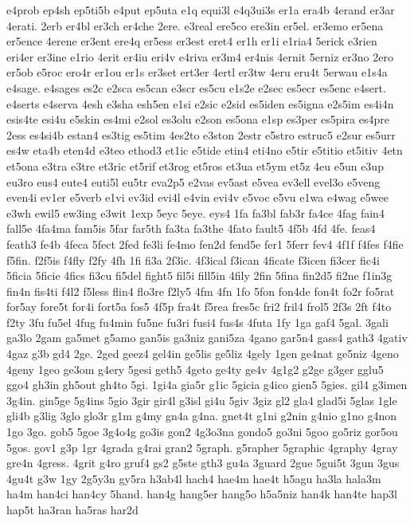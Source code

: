 {e4prob
ep4sh
ep5ti5b
e4put
ep5uta
e1q
equi3l
e4q3ui3s
er1a
era4b
4erand
er3ar
4erati.
2erb
er4bl
er3ch
er4che
2ere.
e3real
ere5co
ere3in
er5el.
er3emo
er5ena
er5ence
4erene
er3ent
ere4q
er5ess
er3est
eret4
er1h
er1i
e1ria4
5erick
e3rien
eri4er
er3ine
e1rio
4erit
er4iu
eri4v
e4riva
er3m4
er4nis
4ernit
5erniz
er3no
2ero
er5ob
e5roc
ero4r
er1ou
er1s
er3set
ert3er
4ertl
er3tw
4eru
eru4t
5erwau
e1s4a
e4sage.
e4sages
es2c
e2sca
es5can
e3scr
es5cu
e1s2e
e2sec
es5ecr
es5enc
e4sert.
e4serts
e4serva
4esh
e3sha
esh5en
e1si
e2sic
e2sid
es5iden
es5igna
e2s5im
es4i4n
esis4te
esi4u
e5skin
es4mi
e2sol
es3olu
e2son
es5ona
e1sp
es3per
es5pira
es4pre
2ess
es4si4b
estan4
es3tig
es5tim
4es2to
e3ston
2estr
e5stro
estruc5
e2sur
es5urr
es4w
eta4b
eten4d
e3teo
ethod3
et1ic
e5tide
etin4
eti4no
e5tir
e5titio
et5itiv
4etn
et5ona
e3tra
e3tre
et3ric
et5rif
et3rog
et5ros
et3ua
et5ym
et5z
4eu
e5un
e3up
eu3ro
eus4
eute4
euti5l
eu5tr
eva2p5
e2vas
ev5ast
e5vea
ev3ell
evel3o
e5veng
even4i
ev1er
e5verb
e1vi
ev3id
evi4l
e4vin
evi4v
e5voc
e5vu
e1wa
e4wag
e5wee
e3wh
ewil5
ew3ing
e3wit
1exp
5eyc
5eye.
eys4
1fa
fa3bl
fab3r
fa4ce
4fag
fain4
fall5e
4fa4ma
fam5is
5far
far5th
fa3ta
fa3the
4fato
fault5
4f5b
4fd
4fe.
feas4
feath3
fe4b
4feca
5fect
2fed
fe3li
fe4mo
fen2d
fend5e
fer1
5ferr
fev4
4f1f
f4fes
f4fie
f5fin.
f2f5is
f4fly
f2fy
4fh
1fi
fi3a
2f3ic.
4f3ical
f3ican
4ficate
f3icen
fi3cer
fic4i
5ficia
5ficie
4fics
fi3cu
fi5del
fight5
fil5i
fill5in
4fily
2fin
5fina
fin2d5
fi2ne
f1in3g
fin4n
fis4ti
f4l2
f5less
flin4
flo3re
f2ly5
4fm
4fn
1fo
5fon
fon4de
fon4t
fo2r
fo5rat
for5ay
fore5t
for4i
fort5a
fos5
4f5p
fra4t
f5rea
fres5c
fri2
fril4
frol5
2f3s
2ft
f4to
f2ty
3fu
fu5el
4fug
fu4min
fu5ne
fu3ri
fusi4
fus4s
4futa
1fy
1ga
gaf4
5gal.
3gali
ga3lo
2gam
ga5met
g5amo
gan5is
ga3niz
gani5za
4gano
gar5n4
gass4
gath3
4gativ
4gaz
g3b
gd4
2ge.
2ged
geez4
gel4in
ge5lis
ge5liz
4gely
1gen
ge4nat
ge5niz
4geno
4geny
1geo
ge3om
g4ery
5gesi
geth5
4geto
ge4ty
ge4v
4g1g2
g2ge
g3ger
gglu5
ggo4
gh3in
gh5out
gh4to
5gi.
1gi4a
gia5r
g1ic
5gicia
g4ico
gien5
5gies.
gil4
g3imen
3g4in.
gin5ge
5g4ins
5gio
3gir
gir4l
g3isl
gi4u
5giv
3giz
gl2
gla4
glad5i
5glas
1gle
gli4b
g3lig
3glo
glo3r
g1m
g4my
gn4a
g4na.
gnet4t
g1ni
g2nin
g4nio
g1no
g4non
1go
3go.
gob5
5goe
3g4o4g
go3is
gon2
4g3o3na
gondo5
go3ni
5goo
go5riz
gor5ou
5gos.
gov1
g3p
1gr
4grada
g4rai
gran2
5graph.
g5rapher
5graphic
4graphy
4gray
gre4n
4gress.
4grit
g4ro
gruf4
gs2
g5ste
gth3
gu4a
3guard
2gue
5gui5t
3gun
3gus
4gu4t
g3w
1gy
2g5y3n
gy5ra
h3ab4l
hach4
hae4m
hae4t
h5agu
ha3la
hala3m
ha4m
han4ci
han4cy
5hand.
han4g
hang5er
hang5o
h5a5niz
han4k
han4te
hap3l
hap5t
ha3ran
ha5ras
har2d
}
